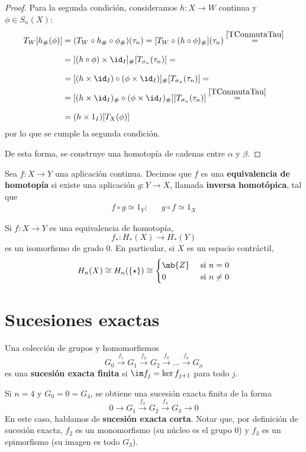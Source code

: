\begin{proof}
Para la segunda condición, consideramos $h\colon X \to W$ continua y $\phi \in
S_n(X)$:
\begin{align*}
T_W[h_\#(\phi)]&=
	(T_W \circ h_\#\circ \phi_\#) (\tau_n)=
	[T_W\circ(h\circ \phi)_\#](\tau_n)\stackrel{\eqref{TConmutaTau}}{=}\\[8pt]
	&=[(h\circ\phi)\times \id_I]_\#[T_{\sigma_n}(\tau_n)]=\\[8pt]
	&=[(h\times \id_I)\circ(\phi\times \id_I)]_\#[T_{\sigma_n}(\tau_n)]=\\
	&=[(h\times \id_I)_\#\circ(\phi\times \id_I)_\#][T_{\sigma_n}(\tau_n)]
	\stackrel{\eqref{TConmutaTau}}{=}\\[8pt]
	&=(h\times 1_I)[T_X(\phi)]
\end{align*}
por lo que se cumple la segunda condición.

De esta forma, se construye una homotopía de cadenas entre $\alpha$ y $\beta$.
\end{proof}

Sea $f\colon X \to Y$ una aplicación continua. Decimos que $f$ es una
\textbf{equivalencia de homotopía} si existe una aplicación $g\colon Y \to X$,
llamada \textbf{inversa homotópica}, tal que
\begin{align*}
f\circ g \simeq 1_Y; && g \circ f \simeq 1_X
\end{align*}

\begin{corollary}
Si $f\colon X \to Y$ es una equivalencia de homotopía,
\[f_*: H_*(X) \to H_*(Y)\]
es un isomorfismo de grado 0. En particular, si $X$ es un espacio contráctil,
\[H_n(X)\cong H_n(\{\star\})\cong
\begin{cases}
\mb{Z} 	& \text{ si $n=0$}\\
0		& \text{ si $n \neq 0$}
\end{cases}\]
\end{corollary}

\section{Sucesiones exactas}
\begin{defn}
Una colección de grupos y homomorfismos
\[G_0 \xrightarrow{ f_1 } G_1 \xrightarrow{ f_2 } G_2 \xrightarrow{ f_3 }
\dots \xrightarrow{ f_n } G_n\]
es una \textbf{sucesión exacta finita} si $\im f_j=\ker f_{j+1}$ para todo $j$.
\end{defn}

Si $n=4$ y $G_0=0=G_4$, se obtiene una sucesión exacta finita de la forma
\[0 \rightarrow G_1 \xrightarrow{ f_2 } G_2
\xrightarrow{ f_3 } G_3 \rightarrow 0\]
En este caso, hablamos de \textbf{sucesión exacta corta}. Notar que, por
definición de sucesión exacta, $f_2$ es un monomorfismo (su núcleo es el grupo 0)
y $f_3$ es un epimorfismo (su imagen es todo $G_3$).

